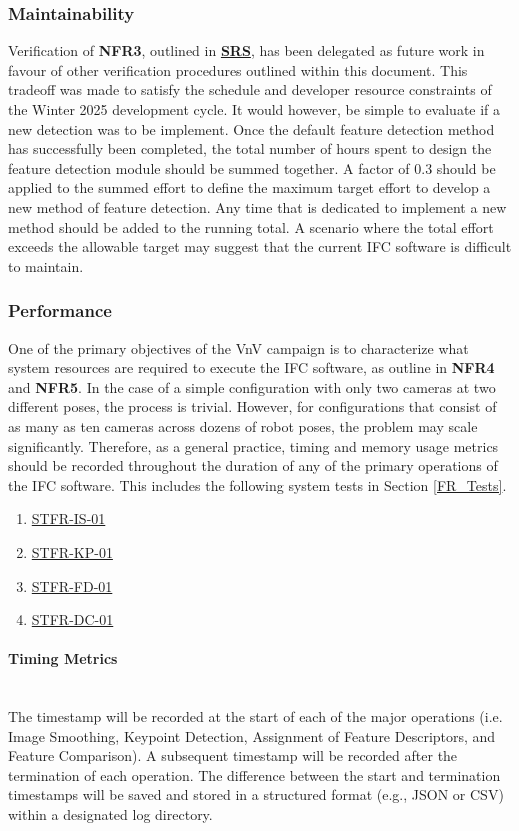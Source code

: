 \documentclass[12pt, titlepage]{article}
\begin{document}
\subsubsection{Maintainability}\label{Maintainability}
Verification of \textbf{NFR3}, outlined in 
\textbf{\href{https://github.com/KiranSingh15/CAS-741-Image-Correspondences/blob/main/docs/SRS/SRS.pdf}
{SRS}}, 
has been delegated as future work in favour of other verification procedures outlined within this 
document. This tradeoff was made to satisfy the schedule and developer resource constraints of the Winter 2025 development cycle. 
It would however, be simple to evaluate if a new detection was to be implement. Once the default feature 
detection method has successfully been completed, the total number of hours spent to design the feature 
detection module should be summed together. A factor of 0.3 should be applied to the summed effort to define 
the maximum target effort to develop a new method of feature detection. Any time that is dedicated to 
implement a new method should be added to the running total. A scenario where the total effort exceeds the 
allowable target may suggest that the current IFC software is difficult to maintain.

\subsubsection{Performance}\label{Performance}
One of the primary objectives of the VnV campaign is to characterize what system resources are required to 
execute the IFC software, as outline in \textbf{NFR4} and \textbf{NFR5}. In the case of a simple configuration 
with only two cameras at two different poses, the process is trivial. However, for configurations that consist 
of as many as ten cameras across dozens of robot poses, the problem may scale significantly. Therefore, as a 
general practice, timing and memory usage metrics should be recorded throughout the duration of any of the 
primary operations of the IFC software. This includes the following system tests in Section \ref{FR_Tests}. 
\begin{enumerate}
\item \hyperlink{STFR-IS-01}{STFR-IS-01}
\item \hyperlink{STFR-KP-01}{STFR-KP-01}
\item \hyperlink{STFR-FD-01}{STFR-FD-01}
\item \hyperlink{STFR-DC-01}{STFR-DC-01}
\end{enumerate}
\paragraph{Timing Metrics}
\mbox{}
\\
The timestamp will be recorded at the start of each of the major operations (i.e. 
Image Smoothing, Keypoint Detection, Assignment of Feature Descriptors, and Feature Comparison). 
A subsequent timestamp will be recorded after the termination of each operation. The difference between 
the start and termination timestamps will be saved and stored in a structured format 
(e.g., JSON or CSV) within a designated log directory.
\end{document}
